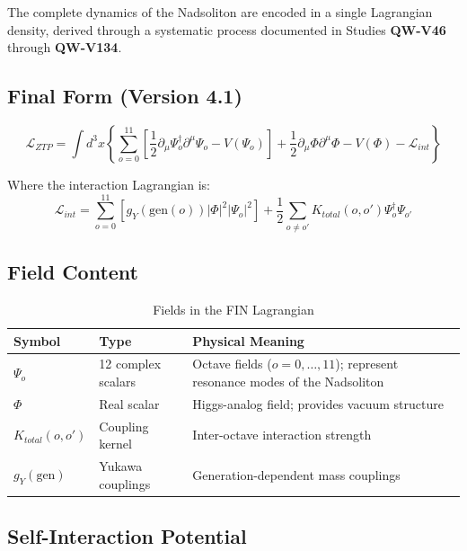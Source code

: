 \documentclass[11pt,a4paper]{book}
\theoremstyle{remark}
\newcommand{\Lagr}{\mathcal{L}}
\newcommand{\QW}[1]{\textbf{QW-#1}}
\begin{document}
The complete dynamics of the Nadsoliton are encoded in a single Lagrangian density, derived through a systematic process documented in Studies \QW{V46} through \QW{V134}.

\subsection{Final Form (Version 4.1)}

\begin{equation}
\boxed{
\Lagr_{ZTP} = \int d^3x \left\{
    \sum_{o=0}^{11} \left[ \frac{1}{2} \partial_\mu\Psi_o^\dagger \partial^\mu\Psi_o - V(\Psi_o) \right]
    + \frac{1}{2} \partial_\mu\Phi \partial^\mu\Phi - V(\Phi)
    - \Lagr_{int}
\right\}
}
\label{eq:lagrangian}
\end{equation}

Where the interaction Lagrangian is:
\begin{equation}
\Lagr_{int} = \sum_{o=0}^{11} \left[ g_Y(\text{gen}(o)) |\Phi|^2 |\Psi_o|^2 \right]
    + \frac{1}{2} \sum_{o \neq o'} K_{total}(o, o') \Psi_o^\dagger \Psi_{o'}
\end{equation}

\subsection{Field Content}

\begin{table}[H]
\centering
\caption{Fields in the FIN Lagrangian}
\begin{tabular}{|l|l|p{8cm}|}
\hline
\textbf{Symbol} & \textbf{Type} & \textbf{Physical Meaning} \\
\hline
$\Psi_o$ & 12 complex scalars & Octave fields ($o = 0, \ldots, 11$); represent resonance modes of the Nadsoliton \\
\hline
$\Phi$ & Real scalar & Higgs-analog field; provides vacuum structure \\
\hline
$K_{total}(o, o')$ & Coupling kernel & Inter-octave interaction strength \\
\hline
$g_Y(\text{gen})$ & Yukawa couplings & Generation-dependent mass couplings \\
\hline
\end{tabular}
\end{table}

\subsection{Self-Interaction Potential}
\end{document}
